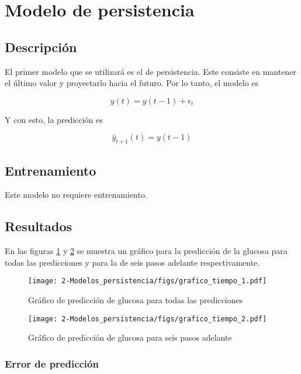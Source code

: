 
\section{Modelo de persistencia}

\subsection{Descripción}

El primer modelo que se utilizará es el de persistencia. Este consiste en mantener el último valor y proyectarlo hacia el futuro. Por lo tanto, el modelo es

\begin{equation}
	y(t) = y(t-1) + \epsilon_t
\end{equation}

Y con esto, la predicción es

\begin{equation}
	\hat{y}_{t+1}(t) = y(t-1)
\end{equation}


\subsection{Entrenamiento}

Este modelo no requiere entrenamiento.

\subsection{Resultados}

En las figuras \ref{fig:M2_grafico_tiempo_1} y \ref{fig:M2_grafico_tiempo_2} se muestra un gráfico para la predicción de la glucosa para todas las predicciones y para la de seis pasos adelante respectivamente.

\begin{figure}[H]
	\centering
	\texttt{[image: 2-Modelos\_persistencia/figs/grafico\_tiempo\_1.pdf]}
	\caption{Gráfico de predicción de glucosa para todas las predicciones}
	\label{fig:M2_grafico_tiempo_1}
\end{figure}

\begin{figure}[H]
	\centering
	\texttt{[image: 2-Modelos\_persistencia/figs/grafico\_tiempo\_2.pdf]}
	\caption{Gráfico de predicción de glucosa para seis pasos adelante}
	\label{fig:M2_grafico_tiempo_2}
\end{figure}


\subsubsection*{Error de predicción}


